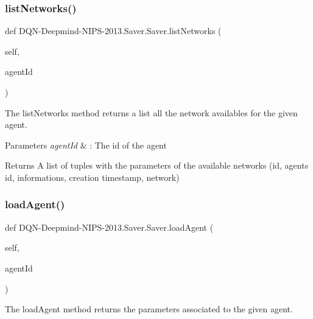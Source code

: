 \subsubsection{\texorpdfstring{list\+Networks()}{listNetworks()}}
{\footnotesize\ttfamily def D\+QN-\/Deepmind-\/N\+I\+PS-\/2013.Saver.\+Saver.\+list\+Networks (\begin{DoxyParamCaption}\item[{}]{self,  }\item[{}]{agent\+Id }\end{DoxyParamCaption})}



The list\+Networks method returns a list all the network availables for the given agent. 


\begin{DoxyParams}{Parameters}
{\em agent\+Id} & \+: The id of the agent\\
\hline
\end{DoxyParams}
\begin{DoxyReturn}{Returns}
A list of tuples with the parameters of the available networks (id, agent\textquotesingle{}s id, informations, creation timestamp, network) 
\end{DoxyReturn}
\hypertarget{classDQN-Deepmind-NIPS-2013_1_1Saver_1_1Saver_aaf903c7b667b1909a17beb60c13f2398}{}\label{classDQN-Deepmind-NIPS-2013_1_1Saver_1_1Saver_aaf903c7b667b1909a17beb60c13f2398} 
\subsubsection{\texorpdfstring{load\+Agent()}{loadAgent()}}
{\footnotesize\ttfamily def D\+QN-\/Deepmind-\/N\+I\+PS-\/2013.Saver.\+Saver.\+load\+Agent (\begin{DoxyParamCaption}\item[{}]{self,  }\item[{}]{agent\+Id }\end{DoxyParamCaption})}



The load\+Agent method returns the parameters associated to the given agent. 


